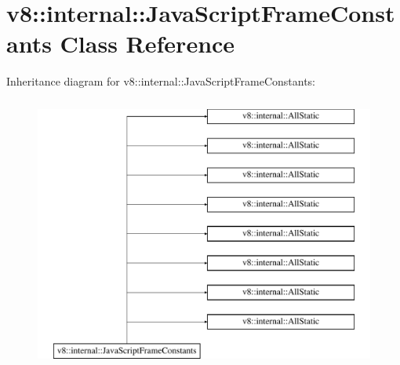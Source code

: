\hypertarget{classv8_1_1internal_1_1JavaScriptFrameConstants}{}\section{v8\+:\+:internal\+:\+:Java\+Script\+Frame\+Constants Class Reference}
\label{classv8_1_1internal_1_1JavaScriptFrameConstants}
Inheritance diagram for v8\+:\+:internal\+:\+:Java\+Script\+Frame\+Constants\+:\begin{figure}[H]
\begin{center}
\leavevmode
\includegraphics[height=9.000000cm]{classv8_1_1internal_1_1JavaScriptFrameConstants}
\end{center}
\end{figure}
